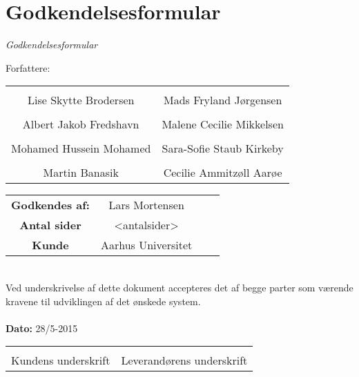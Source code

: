 \chapter{Godkendelsesformular}

{\LARGE\textit{Godkendelsesformular}}

{\large Forfattere:}
\\[5ex]


\begin{tabular}{c c}
\centering 
	\makebox[2.0in]{\hrulefill} & \makebox[2.0in]{\hrulefill}\\
	Lise Skytte Brodersen & Mads Fryland Jørgensen\\[7ex]
	\makebox[2.0in]{\hrulefill} & \makebox[2.0in]{\hrulefill}\\
	Albert Jakob Fredshavn & Malene Cecilie Mikkelsen\\[7ex]
	\makebox[2.0in]{\hrulefill} & \makebox[2.0in]{\hrulefill}\\
	Mohamed Hussein Mohamed & Sara-Sofie Staub Kirkeby\\[7ex]
	\makebox[2.0in]{\hrulefill} & \makebox[2.0in]{\hrulefill}\\
	Martin Banasik & Cecilie Ammitzøll Aarøe\\[7ex]

\end{tabular}

\begin{tabular}{c c c c}
	\textbf{Godkendes af:} & Lars Mortensen\\[3ex]
	\textbf{Antal sider} & <antalsider>\\[3ex]
	\textbf{Kunde} & Aarhus Universitet
\end{tabular}\\[8ex]
Ved underskrivelse af dette dokument accepteres det af begge parter som værende kravene til udviklingen af det ønskede system.
\\
\\
\textbf{Dato: } 28/5-2015\\[7ex]

\begin{tabular}{c c}
	\makebox[2.0in]{\hrulefill} & \makebox[2.0in]{\hrulefill}\\
	\centering 
	Kundens underskrift & Leverandørens underskrift
\end{tabular}

